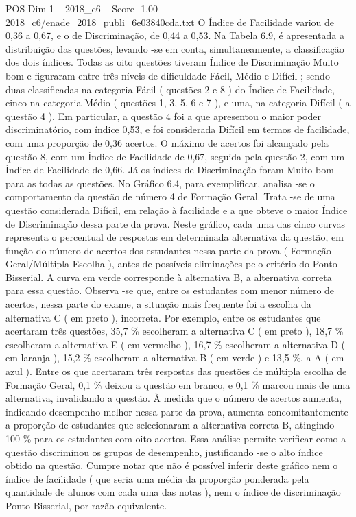 \begin{textsample}{POS Dim 1 – 2018\_c6 – Score -1.00 – 2018\_c6/enade\_2018\_publi\_6e03840cda.txt}
O Índice de Facilidade variou de 0,36 a 0,67, e o de Discriminação, de 0,44 a 0,53.
Na Tabela 6.9, é apresentada a distribuição das questões, levando -se em conta, simultaneamente, a classificação dos dois índices.
Todas as oito questões tiveram Índice de Discriminação Muito bom e figuraram entre três níveis de dificuldade Fácil, Médio e Difícil ; sendo duas classificadas na categoria Fácil ( questões 2 e 8 ) do Índice de Facilidade, cinco na categoria Médio ( questões 1, 3, 5, 6 e 7 ), e uma, na categoria Difícil ( a questão 4 ).
Em particular, a questão 4 foi a que apresentou o maior poder discriminatório, com índice 0,53, e foi considerada Difícil em termos de facilidade, com uma proporção de 0,36 acertos.
O máximo de acertos foi alcançado pela questão 8, com um Índice de Facilidade de 0,67, seguida pela questão 2, com um Índice de Facilidade de 0,66.
Já os índices de Discriminação foram Muito bom para as todas as questões.
No Gráfico 6.4, para exemplificar, analisa -se o comportamento da questão de número 4 de Formação Geral.
Trata -se de uma questão considerada Difícil, em relação à facilidade e a que obteve o maior Índice de Discriminação dessa parte da prova.
Neste gráfico, cada uma das cinco curvas representa o percentual de respostas em determinada alternativa da questão, em função do número de acertos dos estudantes nessa parte da prova ( Formação Geral/Múltipla Escolha ), antes de possíveis eliminações pelo critério do Ponto-Bisserial.
A curva em verde corresponde à alternativa B, a alternativa correta para essa questão.
Observa -se que, entre os estudantes com menor número de acertos, nessa parte do exame, a situação mais frequente foi a escolha da alternativa C ( em preto ), incorreta.
Por exemplo, entre os estudantes que acertaram três questões, 35,7 \% escolheram a alternativa C ( em preto ), 18,7 \% escolheram a alternativa E ( em vermelho ), 16,7 \% escolheram a alternativa D ( em laranja ), 15,2 \% escolheram a alternativa B ( em verde ) e 13,5 \%, a A ( em azul ).
Entre os que acertaram três respostas das questões de múltipla escolha de Formação Geral, 0,1 \% deixou a questão em branco, e 0,1 \% marcou mais de uma alternativa, invalidando a questão.
À medida que o número de acertos aumenta, indicando desempenho melhor nessa parte da prova, aumenta concomitantemente a proporção de estudantes que selecionaram a alternativa correta B, atingindo 100 \% para os estudantes com oito acertos.
Essa análise permite verificar como a questão discriminou os grupos de desempenho, justificando -se o alto índice obtido na questão.
Cumpre notar que não é possível inferir deste gráfico nem o índice de facilidade ( que seria uma média da proporção ponderada pela quantidade de alunos com cada uma das notas ), nem o índice de discriminação Ponto-Bisserial, por razão equivalente.

\end{textsample}
